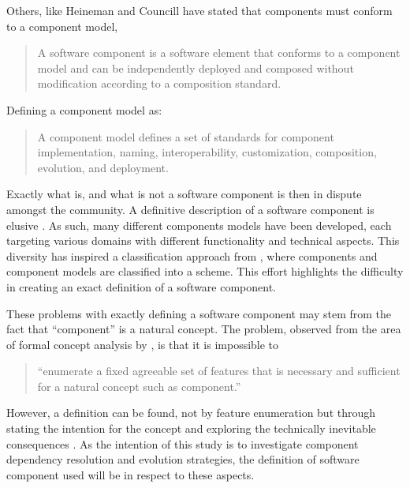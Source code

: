 Others, like Heineman and Councill \cite{heineman2001component} have stated that components must conform to a component model, 
\begin{quotation}
A software component is a software element that conforms to a component model and can be independently deployed and composed without modification according to a composition standard.
\end{quotation}

Defining a component model as:
\begin{quotation}
A component model defines a set of standards for component implementation, naming, interoperability, customization, composition, evolution, and deployment.
\end{quotation}

Exactly what is, and what is not a software component is then in dispute amongst the community.
A definitive description of a software component is elusive \cite{vasa2007patterns}.
As such, many different components models have been developed, each targeting various domains with different functionality and technical aspects.
This diversity has inspired a classification approach from \cite{Crnkovic2011}, where components and component models are classified into a scheme.
This effort highlights the difficulty in creating an exact definition of a software component. 

These problems with exactly defining a software component may stem from the fact that ``component'' is a natural concept.
The problem, observed from the area of formal concept analysis \cite{Ganter1999} by \cite{Szyperski2002}, is that it is impossible to

\begin{quotation} 
``enumerate a fixed agreeable set of features that is necessary and sufficient for a natural concept such as component.'' 
\end{quotation}

However, a definition can be found, not by feature enumeration but through stating the intention for the concept and exploring the technically inevitable consequences \cite{Szyperski2002}. 
As the intention of this study is to investigate component dependency resolution and evolution strategies,
the definition of software component used will be in respect to these aspects.


